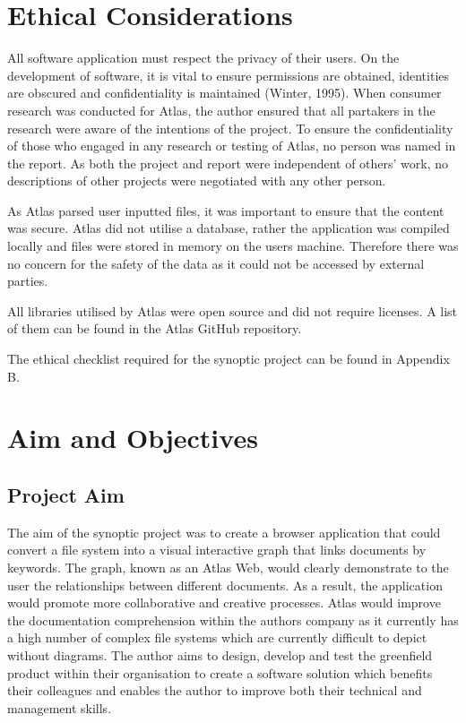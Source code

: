 \documentclass{article}
\begin{document}
\newpage

\section{Ethical Considerations}

All software application must respect the privacy of their users. On the development of software, it is vital to ensure permissions are obtained, identities are obscured and confidentiality is maintained (Winter, 1995). When consumer research was conducted for Atlas, the author ensured that all partakers in the research were aware of the intentions of the project. To ensure the confidentiality of those who engaged in any research or testing of Atlas, no person was named in the report. As both the project and report were independent of others’ work, no descriptions of other projects were negotiated with any other person. 

As Atlas parsed user inputted files, it was important to ensure that the content was secure. Atlas did not utilise a database, rather the application was compiled locally and files were stored in memory on the users machine. Therefore there was no concern for the safety of the data as it could not be accessed by external parties.

All libraries utilised by Atlas were open source and did not require licenses. A list of them can be found in the Atlas GitHub repository.

The ethical checklist required for the synoptic project can be found in Appendix B.

\newpage

\section{Aim and Objectives}

\subsection{Project Aim}

The aim of the synoptic project was to create a browser application that could convert a file system into a visual interactive graph that links documents by keywords. The graph, known as an Atlas Web, would clearly demonstrate to the user the relationships between different documents. As a result, the application would promote more collaborative and creative processes. Atlas would improve the documentation comprehension within the authors company as it currently has a high number of complex file systems which are currently difficult to depict without diagrams. The author aims to design, develop and test the greenfield product within their organisation to create a software solution which benefits their colleagues and enables the author to improve both their technical and management skills.
\end{document}
